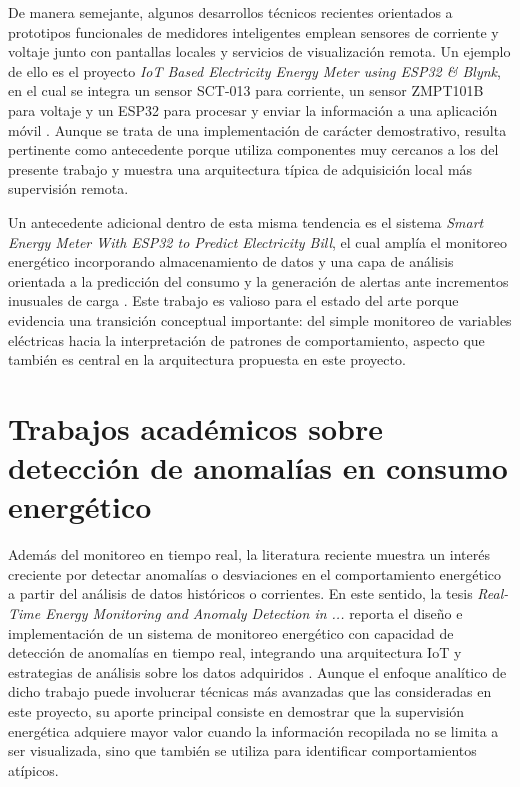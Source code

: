 ﻿\documentclass[12pt,openright,oneside]{report}
\theoremstyle{mytheoremstyle}
\theoremstyle{mytheoremstyle}
\theoremstyle{myproblemstyle}
\begin{document}
De manera semejante, algunos desarrollos técnicos recientes orientados a prototipos funcionales de medidores inteligentes emplean sensores de corriente y voltaje junto con pantallas locales y servicios de visualización remota. Un ejemplo de ello es el proyecto \textit{IoT Based Electricity Energy Meter using ESP32 \& Blynk}, en el cual se integra un sensor SCT-013 para corriente, un sensor ZMPT101B para voltaje y un ESP32 para procesar y enviar la información a una aplicación móvil \cite{iot-energy-meter-blynk}. Aunque se trata de una implementación de carácter demostrativo, resulta pertinente como antecedente porque utiliza componentes muy cercanos a los del presente trabajo y muestra una arquitectura típica de adquisición local más supervisión remota.

Un antecedente adicional dentro de esta misma tendencia es el sistema \textit{Smart Energy Meter With ESP32 to Predict Electricity Bill}, el cual amplía el monitoreo energético incorporando almacenamiento de datos y una capa de análisis orientada a la predicción del consumo y la generación de alertas ante incrementos inusuales de carga \cite{esp32-bill-predictor-2025}. Este trabajo es valioso para el estado del arte porque evidencia una transición conceptual importante: del simple monitoreo de variables eléctricas hacia la interpretación de patrones de comportamiento, aspecto que también es central en la arquitectura propuesta en este proyecto.

\section{Trabajos académicos sobre detección de anomalías en consumo energético}

Además del monitoreo en tiempo real, la literatura reciente muestra un interés creciente por detectar anomalías o desviaciones en el comportamiento energético a partir del análisis de datos históricos o corrientes. En este sentido, la tesis \textit{Real-Time Energy Monitoring and Anomaly Detection in ...} reporta el diseño e implementación de un sistema de monitoreo energético con capacidad de detección de anomalías en tiempo real, integrando una arquitectura IoT y estrategias de análisis sobre los datos adquiridos \cite{real-time-anomaly-thesis}. Aunque el enfoque analítico de dicho trabajo puede involucrar técnicas más avanzadas que las consideradas en este proyecto, su aporte principal consiste en demostrar que la supervisión energética adquiere mayor valor cuando la información recopilada no se limita a ser visualizada, sino que también se utiliza para identificar comportamientos atípicos.
\end{document}
